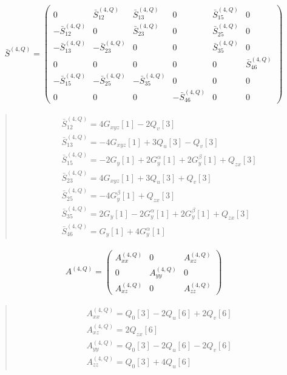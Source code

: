 \documentclass[fleqn,10pt]{jsarticle}
\begin{document}
\begin{align*}
\bar{S}^{(4,Q)} = \begin{pmatrix} 0 & \bar{S}^{(4,Q)}_{12} & \bar{S}^{(4,Q)}_{13} & 0 & \bar{S}^{(4,Q)}_{15} & 0 \\ - \bar{S}^{(4,Q)}_{12} & 0 & \bar{S}^{(4,Q)}_{23} & 0 & \bar{S}^{(4,Q)}_{25} & 0 \\ - \bar{S}^{(4,Q)}_{13} & - \bar{S}^{(4,Q)}_{23} & 0 & 0 & \bar{S}^{(4,Q)}_{35} & 0 \\ 0 & 0 & 0 & 0 & 0 & \bar{S}^{(4,Q)}_{46} \\ - \bar{S}^{(4,Q)}_{15} & - \bar{S}^{(4,Q)}_{25} & - \bar{S}^{(4,Q)}_{35} & 0 & 0 & 0 \\ 0 & 0 & 0 & - \bar{S}^{(4,Q)}_{46} & 0 & 0 \end{pmatrix}
\end{align*}
\begin{quote}
\begin{align*}
& \bar{S}^{(4,Q)}_{12} = 4 G_{xyz}[1] - 2 Q_{v}[3] \\
& \bar{S}^{(4,Q)}_{13} = - 4 G_{xyz}[1] + 3 Q_{u}[3] - Q_{v}[3] \\
& \bar{S}^{(4,Q)}_{15} = - 2 G_{y}[1] + 2 G_{y}^{\alpha}[1] + 2 G_{y}^{\beta}[1] + Q_{zx}[3] \\
& \bar{S}^{(4,Q)}_{23} = 4 G_{xyz}[1] + 3 Q_{u}[3] + Q_{v}[3] \\
& \bar{S}^{(4,Q)}_{25} = - 4 G_{y}^{\beta}[1] + Q_{zx}[3] \\
& \bar{S}^{(4,Q)}_{35} = 2 G_{y}[1] - 2 G_{y}^{\alpha}[1] + 2 G_{y}^{\beta}[1] + Q_{zx}[3] \\
& \bar{S}^{(4,Q)}_{46} = G_{y}[1] + 4 G_{y}^{\alpha}[1]
\end{align*}
\end{quote}
\begin{align*}
A^{(4,Q)} = \begin{pmatrix} A^{(4,Q)}_{xx} & 0 & A^{(4,Q)}_{xz} \\ 0 & A^{(4,Q)}_{yy} & 0 \\ A^{(4,Q)}_{xz} & 0 & A^{(4,Q)}_{zz} \end{pmatrix}
\end{align*}
\begin{quote}
\begin{align*}
& A^{(4,Q)}_{xx} = Q_{0}[3] - 2 Q_{u}[6] + 2 Q_{v}[6] \\
& A^{(4,Q)}_{xz} = 2 Q_{zx}[6] \\
& A^{(4,Q)}_{yy} = Q_{0}[3] - 2 Q_{u}[6] - 2 Q_{v}[6] \\
& A^{(4,Q)}_{zz} = Q_{0}[3] + 4 Q_{u}[6]
\end{align*}
\end{quote}
\end{document}
